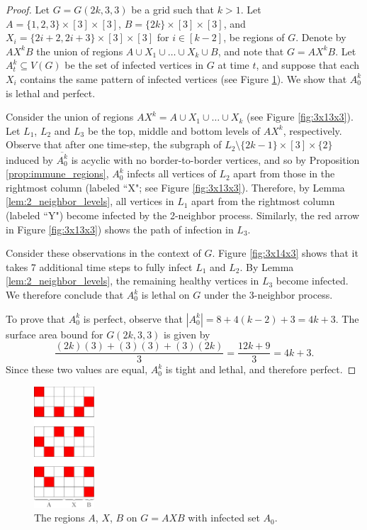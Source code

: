 \begin{proof}
Let $G=G(2k,3,3)$ be a grid such that $k > 1$. Let $A = \{1,2,3\} \times [3] \times [3]$, $B = \{2k\} \times [3] \times [3]$, and $X_i = \{2i+2,2i+3\} \times [3] \times [3]$ for $i \in [k-2]$, be regions of $G$. Denote by $AX^kB$ the union of regions $A \cup X_1 \cup \dots \cup X_{k} \cup B$, and note that $G=AX^kB$. Let $A_t^k \subseteq V(G)$ be the set of infected vertices in $G$ at time $t$, and suppose that each $X_i$ contains the same pattern of infected vertices (see Figure \ref{fig:3x6x3}). We show that $A_0^k$ is lethal and perfect. 

Consider the union of regions $AX^k = A \cup X_1 \cup \dots \cup X_{k}$ (see Figure \ref{fig:3x13x3}). Let $L_1$, $L_2$ and $L_3$ be the top, middle and bottom levels of $AX^k$, respectively. Observe that after one time-step, the subgraph of $L_2 \setminus \{2k-1\} \times [3] \times \{2\}$ induced by $\overline{A_0^k}$ is acyclic with no border-to-border vertices, and so by Proposition \ref{prop:immune_regions}, $A_0^k$ infects all vertices of $L_2$ apart from those in the rightmost column (labeled ``X"; see Figure \ref{fig:3x13x3}). Therefore, by Lemma \ref{lem:2_neighbor_levels}, all vertices in $L_1$ apart from the rightmost column (labeled ``Y") become infected by the 2-neighbor process. Similarly, the red arrow in Figure \ref{fig:3x13x3}) shows the path of infection in $L_3$. 

Consider these observations in the context of $G$. Figure \ref{fig:3x14x3} shows that it takes 7 additional time steps to fully infect $L_1$ and $L_2$. By Lemma \ref{lem:2_neighbor_levels}, the remaining healthy vertices in $L_3$ become infected. We therefore conclude that $A_0^k$ is lethal on $G$ under the 3-neighbor process.

To prove that $A_0^k$ is perfect, observe that $|A_0^k| = 8 + 4(k-2) + 3=4k+3$. The surface area bound for $G(2k,3,3)$ is given by
$$\frac{(2k)(3) + (3)(3) + (3)(2k)}{3} = \frac{12k + 9}{3} = 4k+3.$$
Since these two values are equal, $A_0^k$ is tight and lethal, and therefore perfect.
\end{proof}

\begin{figure}[]
\centering
\includegraphics[width=0.2\textwidth]{figures/7/3x6x3.pdf}
\caption{The regions $A$, $X$, $B$ on $G=AXB$ with infected set $A_0$.}
\label{fig:3x6x3}
\end{figure} 

